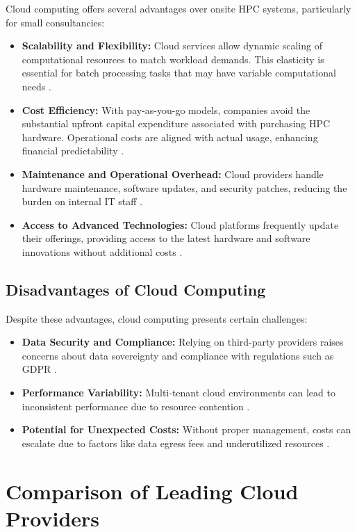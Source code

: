 \documentclass{article}
\begin{document}
Cloud computing offers several advantages over onsite HPC systems, particularly for small consultancies:
\begin{itemize}
    \item \textbf{Scalability and Flexibility:} Cloud services allow dynamic scaling of computational resources to match workload demands. This elasticity is essential for batch processing tasks that may have variable computational needs \parencite{armbrust2010cloud}.
    \item \textbf{Cost Efficiency:} With pay-as-you-go models, companies avoid the substantial upfront capital expenditure associated with purchasing HPC hardware. Operational costs are aligned with actual usage, enhancing financial predictability \parencite{li2019decision}.
    \item \textbf{Maintenance and Operational Overhead:} Cloud providers handle hardware maintenance, software updates, and security patches, reducing the burden on internal IT staff \parencite{marinescu2013cloud}.
    \item \textbf{Access to Advanced Technologies:} Cloud platforms frequently update their offerings, providing access to the latest hardware and software innovations without additional costs \parencite{dillon2010cloud}.
\end{itemize}

\subsection{Disadvantages of Cloud Computing}

Despite these advantages, cloud computing presents certain challenges:
\begin{itemize}
    \item \textbf{Data Security and Compliance:} Relying on third-party providers raises concerns about data sovereignty and compliance with regulations such as GDPR \parencite{hashem2015bigdata}.
    \item \textbf{Performance Variability:} Multi-tenant cloud environments can lead to inconsistent performance due to resource contention \parencite{leitner2016patterns}.
    \item \textbf{Potential for Unexpected Costs:} Without proper management, costs can escalate due to factors like data egress fees and underutilized resources \parencite{rehman2018cloud}.
\end{itemize}

\section{Comparison of Leading Cloud Providers}
\end{document}
